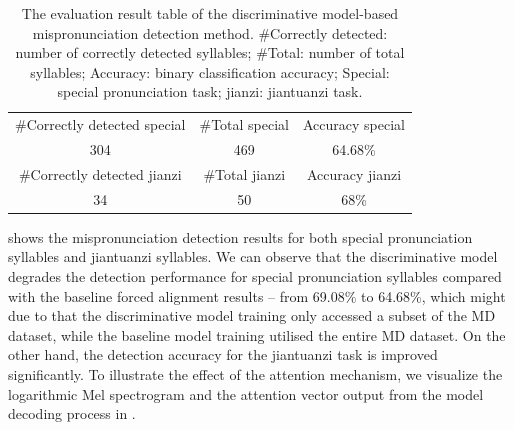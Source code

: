 \begin{table}[ht!]
\centering
\caption{The evaluation result table of the discriminative model-based mispronunciation detection method. \#Correctly detected: number of correctly detected syllables; \#Total: number of total syllables; Accuracy: binary classification accuracy; Special: special pronunciation task; jianzi: jiantuanzi task.}
\label{tab:ch6:results_discriminative_eval}
\begin{tabular}{ccc}
\toprule
\#Correctly detected special & \#Total special & Accuracy special \\
304 & 469 & 64.68\% \\
\midrule
\#Correctly detected jianzi & \#Total jianzi & Accuracy jianzi \\
34 & 50 & 68\% \\
\bottomrule
\end{tabular}
\end{table}

 shows the mispronunciation detection results for both special pronunciation syllables and \gls{jiantuanzi} syllables. We can observe that the discriminative model degrades the detection performance for special pronunciation syllables compared with the baseline forced alignment results -- from 69.08\% to 64.68\%, which might due to that the discriminative model training only accessed a subset of the MD dataset, while the baseline model training utilised the entire MD dataset. On the other hand, the detection accuracy for the \gls{jiantuanzi} task is improved significantly. To illustrate the effect of the attention mechanism, we visualize the logarithmic Mel spectrogram and the attention vector output from the model decoding process in .

